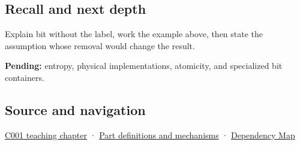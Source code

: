 \subsection{Recall and next depth}\label{appendix-ddbb69998a2e-recall-and-next-depth}

Explain bit without the label, work the example above, then state the assumption whose removal would change the result.

\textbf{Pending:} entropy, physical implementations, atomicity, and specialized bit containers.

\subsection{Source and navigation}\label{appendix-ddbb69998a2e-source-and-navigation}

\hyperref[01-foundations-i-ch001-from-a-signal-to-an-interpretation]{C001 teaching chapter} · \hyperref[appendix-fd090d982a15]{Part definitions and mechanisms} · \hyperref[appendix-4ad47bdd269a]{Dependency Map}
